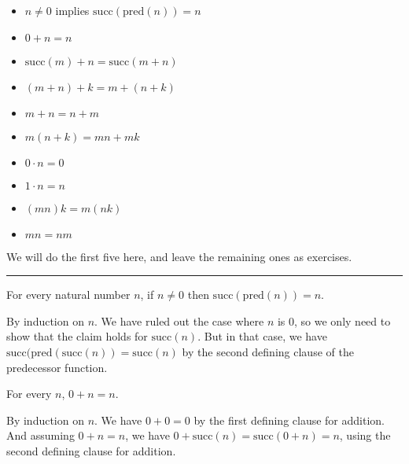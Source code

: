 \documentclass[letterpaper,10pt,english]{sphinxmanual}
\begin{document}
\begin{itemize}
\item {} 
\sphinxAtStartPar
\(n \neq 0\) implies \(\mathrm{succ}(\mathrm{pred}(n)) = n\)

\item {} 
\sphinxAtStartPar
\(0 + n = n\)

\item {} 
\sphinxAtStartPar
\(\mathrm{succ}(m) + n = \mathrm{succ}(m + n)\)

\item {} 
\sphinxAtStartPar
\((m + n) + k = m + (n + k)\)

\item {} 
\sphinxAtStartPar
\(m + n = n + m\)

\item {} 
\sphinxAtStartPar
\(m(n + k) = mn + mk\)

\item {} 
\sphinxAtStartPar
\(0 \cdot n = 0\)

\item {} 
\sphinxAtStartPar
\(1 \cdot n = n\)

\item {} 
\sphinxAtStartPar
\((mn)k = m(nk)\)

\item {} 
\sphinxAtStartPar
\(mn = nm\)

\end{itemize}

\sphinxAtStartPar
We will do the first five here, and leave the remaining ones as exercises.


\bigskip\hrule\bigskip


\sphinxAtStartPar
{} For every natural number \(n\), if \(n \neq 0\) then \(\mathrm{succ}(\mathrm{pred}(n)) = n\).

\sphinxAtStartPar
{} By induction on \(n\). We have ruled out the case where \(n\) is \(0\), so we only need to show that the claim holds for \(\mathrm{succ}(n)\). But in that case, we have \(\mathrm{succ}(\mathrm{pred}(\mathrm{succ}(n)) = \mathrm{succ}(n)\) by the second defining clause of the predecessor function.

\sphinxAtStartPar
{} For every \(n\), \(0 + n = n\).

\sphinxAtStartPar
{} By induction on \(n\). We have \(0 + 0 = 0\) by the first defining clause for addition. And assuming \(0 + n = n\), we have \(0 + \mathrm{succ}(n) = \mathrm{succ}(0 + n) = n\), using the second defining clause for addition.
\end{document}
